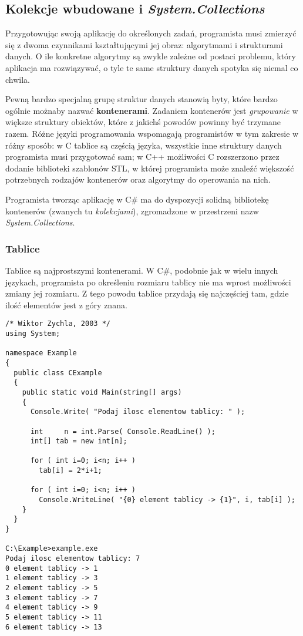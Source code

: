 ﻿\subsection{Kolekcje wbudowane i {\em System.Collections}}

Przygotowując swoją aplikację do określonych zadań, programista musi zmierzyć się z dwoma czynnikami
kształtującymi jej obraz: algorytmami i strukturami danych. O ile konkretne algorytmy są zwykle zależne
od postaci problemu, który aplikacja ma rozwiązywać, o tyle te same struktury danych spotyka się niemal co chwila.

Pewną bardzo specjalną grupę struktur danych stanowią byty, które bardzo ogólnie możnaby nazwać 
{\bf kontenerami}. Zadaniem kontenerów jest {\em grupowanie} w większe struktury obiektów, 
które z jakichś powodów powinny być trzymane razem. Różne języki programowania wspomagają programistów 
w tym zakresie w różny sposób: w C tablice są częścią języka, wszystkie inne struktury danych programista
musi przygotować sam; w C++ możliwości C rozszerzono przez dodanie biblioteki szablonów STL, w której
programista może znaleźć większość potrzebnych rodzajów kontenerów oraz algorytmy do operowania na nich.

Programista tworząc aplikację w C\# ma do dyspozycji solidną bibliotekę kontenerów (zwanych tu {\em kolekcjami}),
zgromadzone w przestrzeni nazw {\em System.Collections}. 

\subsubsection{Tablice}

Tablice są najprostszymi kontenerami. W C\#, podobnie jak w wielu innych językach, 
programista po określeniu rozmiaru tablicy nie ma wprost możliwości zmiany jej rozmiaru. Z tego powodu
tablice przydają się najczęściej tam, gdzie ilość elementów jest z góry znana. 

\begin{scriptsize}
\begin{verbatim}
/* Wiktor Zychla, 2003 */
using System;

namespace Example
{
  public class CExample 
  {
    public static void Main(string[] args)
    {
      Console.Write( "Podaj ilosc elementow tablicy: " );

      int     n = int.Parse( Console.ReadLine() );
      int[] tab = new int[n];

      for ( int i=0; i<n; i++ )
        tab[i] = 2*i+1;

      for ( int i=0; i<n; i++ )
        Console.WriteLine( "{0} element tablicy -> {1}", i, tab[i] );
    }
  }
}

C:\Example>example.exe
Podaj ilosc elementow tablicy: 7
0 element tablicy -> 1
1 element tablicy -> 3
2 element tablicy -> 5
3 element tablicy -> 7
4 element tablicy -> 9
5 element tablicy -> 11
6 element tablicy -> 13
\end{verbatim}
\end{scriptsize}

